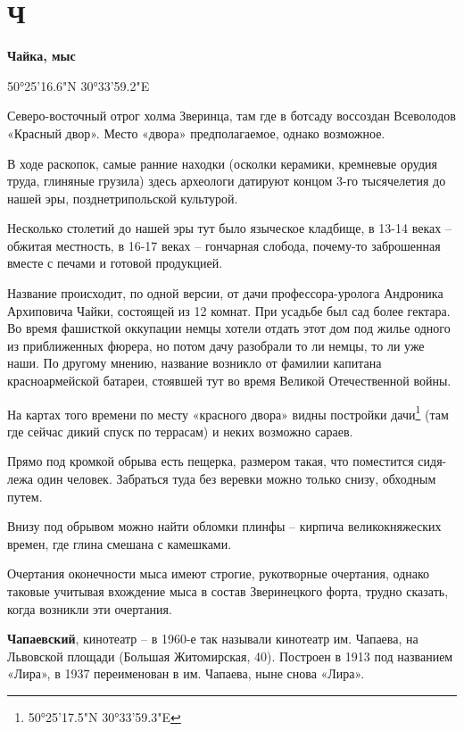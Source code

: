 \chapter*{Ч}

\textbf{Чайка, мыс}

50°25'16.6"N 30°33'59.2"E

Северо-восточный отрог холма Зверинца, там где в ботсаду воссоздан Всеволодов «Красный двор». Место «двора» предполагаемое, однако возможное. 

В ходе раскопок, самые ранние находки (осколки керамики, кремневые орудия труда, глиняные грузила) здесь  археологи датируют концом 3-го тысячелетия до нашей эры, позднетрипольской культурой.

Несколько столетий до нашей эры тут было языческое кладбище, в 13-14 веках – обжитая местность, в 16-17 веках – гончарная слобода, почему-то заброшенная вместе с печами и готовой продукцией.

Название происходит, по одной версии, от дачи профессора-уролога Андроника Архиповича Чайки, состоящей из 12 комнат. При усадьбе был сад более гектара. Во время фашисткой оккупации немцы хотели отдать этот дом под жилье одного из приближенных фюрера, но потом дачу разобрали то ли немцы, то ли уже наши. По другому мнению, название возникло от фамилии капитана красноармейской батареи, стоявшей тут во время Великой Отечественной войны.

На картах того времени по месту «красного двора» видны постройки дачи\footnote{50°25'17.5"N 30°33'59.3"E} (там где сейчас дикий спуск по террасам) и неких возможно сараев.

Прямо под кромкой обрыва есть пещерка, размером такая, что поместится сидя-лежа один человек. Забраться туда без веревки можно только снизу, обходным путем.

Внизу под обрывом можно найти обломки плинфы – кирпича великокняжеских времен, где глина смешана с камешками.

Очертания оконечности мыса имеют строгие, рукотворные очертания, однако таковые учитывая вхождение мыса в состав Зверинецкого форта, трудно сказать, когда возникли эти очертания.\\ 

\medskip

\textbf{Чапаевский}, кинотеатр – в 1960-е так называли кинотеатр им. Чапаева, на Львовской площади (Большая Житомирская, 40). Построен в 1913 под названием «Лира», в 1937 переименован в им. Чапаева, ныне снова «Лира».\\

